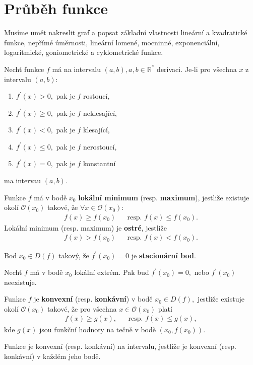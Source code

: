 \section{Průběh funkce}
\begin{pozn}
    Musíme umět nakreslit graf a popsat základní vlastnosti lineární a
    kvadratické funkce, nepřímé úměrnosti, lineární lomené, mocninné, exponenciální,
    logaritmické, goniometrické a cyklometrické funkce.
\end{pozn}

\begin{veta}
Nechť funkce $f$ má na intervalu $(a,b),a,b\in \mathbb R^*$ derivaci. Je-li pro
všechna $x$ z intervalu $(a,b)$:
\begin{enumerate}[$i.$]
\item $f^\prime(x)>0,$ pak je $f$ rostoucí,
\item $f^\prime(x)\geq 0,$ pak je $f$ neklesající,
\item $f^\prime(x)<0,$ pak je $f$ klesající,
\item $f^\prime(x) \leq 0,$ pak je $f$ nerostoucí,
\item $f^\prime(x)=0,$ pak je $f$ konstantní
\end{enumerate}
ma intervau $(a,b).$
\end{veta}

\begin{definition}
Funkce $f$ má v bodě $x_0$ \textbf{lokální minimum} (resp. \textbf{maximum}),
jestliže existuje okolí $\mathscr O(x_0)$ takové, že $\forall x \in \mathscr O(x_0):$
\begin{align*}
    f(x)\geq f(x_0) & & \textrm{resp. } f(x)\leq f(x_0).
\end{align*}
Lokální minimum (resp. maximum) je \textbf{ostré}, jestliže
\begin{align*}
    f(x)> f(x_0) & & \textrm{resp. } f(x)<f(x_0).
\end{align*}
\end{definition}

\begin{definition}
Bod $x_0\in D(f)$ takový, že $f^\prime(x_0)=0$ je \textbf{stacionární bod}.
\end{definition}

\begin{veta}
Nechť $f$ má v bodě $x_0$ lokální extrém. Pak buď $f^\prime(x_0)=0,$ nebo
$f^\prime(x_0)$ neexistuje.
\end{veta}

\begin{definition}
Funkce $f$ je \textbf{konvexní} (resp. \textbf{konkávní}) v bodě $x_0\in D(f),$
jestliže existuje okolí $\mathscr O(x_0)$ takové, že pro všechna $x\in\mathscr O(x_0)$
platí
\begin{align*}
    f(x)\geq g(x), & & \textrm{resp. } f(x)\leq g(x),
\end{align*}
kde $g(x)$ jsou funkční hodnoty na tečně v bodě $(x_0,f(x_0)).$

Funkce je konvexní (resp. konkávní) na intervalu, jestliže je konvexní (resp.
konkávní) v každém jeho bodě.
\end{definition}

